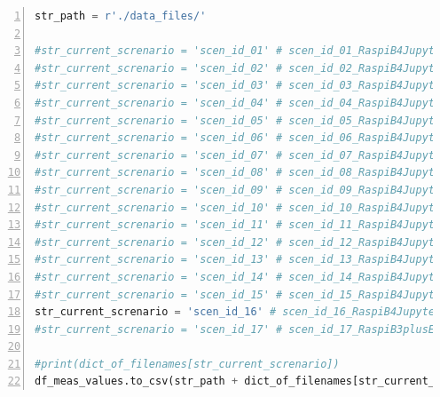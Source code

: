 \documentclass[10pt,parskip=half,
toc=sectionentrywithdots,
bibliography=totocnumbered,
captions=tableheading,numbers=noendperiod]{scrartcl}
\begin{document}
\begin{codecell}[H]
\caption{Save all measurements to CSV files}
\label{code:save_measurements}
\begin{lstlisting}[language=Python,numbers=left,xleftmargin=20pt,xrightmargin=5pt,belowskip=5pt,aboveskip=5pt]
str_path = r'./data_files/'

#str_current_screnario = 'scen_id_01' # scen_id_01_RaspiB4JupyterLab_plasticCase_woHeatSinks_woThermalTape_woFan
#str_current_screnario = 'scen_id_02' # scen_id_02_RaspiB4JupyterLab_plasticCase_wAluHeatSinks_thermalTape_woFan
#str_current_screnario = 'scen_id_03' # scen_id_03_RaspiB4JupyterLab_pinkRaspiCase_wAluHeatSinks_thermalTape_woFan
#str_current_screnario = 'scen_id_04' # scen_id_04_RaspiB4JupyterLab_plasticCase_wAluHeatSinks_siliconPads_woFan
#str_current_screnario = 'scen_id_05' # scen_id_05_RaspiB4JupyterLab_plasticCase_wCopperHeatSink_siliconPads_woFan
#str_current_screnario = 'scen_id_06' # scen_id_06_RaspiB4JupyterLab_plasticCase_wAluHeatSinks_thermalTape_wFan5V
#str_current_screnario = 'scen_id_07' # scen_id_07_RaspiB4JupyterLab_plasticCase_wAluHeatSinks_thermalTape_wFan5Vrev
#str_current_screnario = 'scen_id_08' # scen_id_08_RaspiB4JupyterLab_plasticCase_wAluHeatSinks_thermalTape_wFan3V
#str_current_screnario = 'scen_id_09' # scen_id_09_RaspiB4JupyterLab_plasticCase_wAluHeatSinks_thermalTape_wNoctuaFan5V
#str_current_screnario = 'scen_id_10' # scen_id_10_RaspiB4JupyterLab_plasticCase_wAluHeatSinks_thermalTape_wNoctuaFan5Vrev
#str_current_screnario = 'scen_id_11' # scen_id_11_RaspiB4JupyterLab_plasticCase_wAluHeatSinks_thermalTape_wNoctuaFan3V
#str_current_screnario = 'scen_id_12' # scen_id_12_RaspiB4JupyterLab_plasticCase_wCopperHeatSink_siliconPad_wNoctuaFan3V
#str_current_screnario = 'scen_id_13' # scen_id_13_RaspiB4JupyterLab_woCase_wBigAluHeatSink_siliconPads_CtrlFan70C
#str_current_screnario = 'scen_id_14' # scen_id_14_RaspiB4JupyterLab_woCase_wBigAluHeatSink_siliconPads_CtrlFan65C
#str_current_screnario = 'scen_id_15' # scen_id_15_RaspiB4JupyterLab_woCase_wAluCopperHeatPipes_siliconPads_wFan5V
str_current_screnario = 'scen_id_16' # scen_id_16_RaspiB4JupyterLab_woCase_wAluCopperHeatPipes_siliconPads_wFan3V
#str_current_screnario = 'scen_id_17' # scen_id_17_RaspiB3plusEPaper_plasticCase_wAluHeatSinks_thermalTape_woFan

#print(dict_of_filenames[str_current_screnario])
df_meas_values.to_csv(str_path + dict_of_filenames[str_current_screnario] +'.csv', sep ='\t', index = False, header=True)
\end{lstlisting}\end{codecell}
\end{document}
